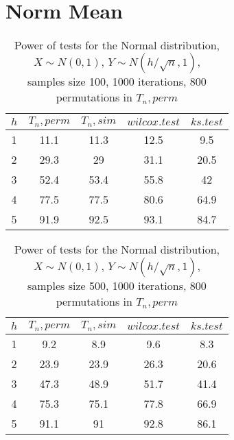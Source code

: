 \documentclass{report}
\begin{document}
\newpage

\section*{Norm Mean}

\begin{longtable}{|c|c|c|c|c|}
  \caption{Power of tests for the Normal distribution, \\
           $X\sim N(0,1)$, $Y\sim N(h/\sqrt{n},1)$, \\
           samples size 100, 1000 iterations, 800 permutations in $T_n, perm$} \\
  \hline
  $h$ & $T_n, perm$ & $T_n, sim$ & $wilcox.test$ & $ks.test$ \\ \hline
  1 & 11.1 & 11.3 & 12.5 & 9.5 \\
  2 & 29.3 & 29 & 31.1 & 20.5 \\
  3 & 52.4 & 53.4 & 55.8 & 42 \\
  4 & 77.5 & 77.5 & 80.6 & 64.9 \\
  5 & 91.9 & 92.5 & 93.1 & 84.7 \\
  \hline
\end{longtable}

\begin{longtable}{|c|c|c|c|c|}
  \caption{Power of tests for the Normal distribution, \\
           $X\sim N(0,1)$, $Y\sim N(h/\sqrt{n},1)$, \\
           samples size 500, 1000 iterations, 800 permutations in $T_n, perm$} \\
  \hline
  $h$ & $T_n, perm$ & $T_n, sim$ & $wilcox.test$ & $ks.test$ \\ \hline
  1 & 9.2 & 8.9 & 9.6 & 8.3 \\
  2 & 23.9 & 23.9 & 26.3 & 20.6 \\
  3 & 47.3 & 48.9 & 51.7 & 41.4 \\
  4 & 75.3 & 75.1 & 77.8 & 66.9 \\
  5 & 91.1 & 91 & 92.8 & 86.1 \\
  \hline
\end{longtable}
\end{document}
